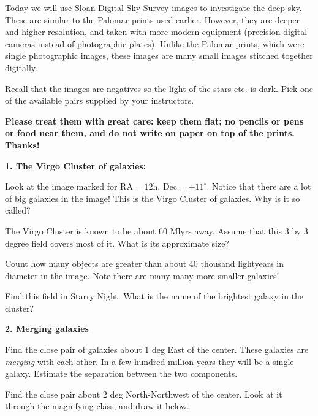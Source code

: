 
\noindent Today we will use Sloan Digital Sky Survey images
to investigate the deep sky. These are similar to the Palomar prints
used earlier. However, they are deeper and higher resolution, and
taken with more modern equipment (precision digital cameras instead of
photographic plates). Unlike the Palomar prints, which were single
photographic images, these images are many small images stitched
together digitally. 

Recall that the images are negatives so the light of the stars etc. is
dark. Pick one of the available pairs supplied by your instructors.

{\bf Please treat them with great care: keep them flat; no pencils or
pens or food near them, and do not write on paper on top of the
prints. Thanks!}

\noindent
{\bf 1. The Virgo Cluster of galaxies:} 

\noindent Look at the image marked for RA$=12$h,
Dec$=+11^\circ$. Notice that there are a lot of big galaxies in the
image! This is the Virgo Cluster of galaxies.  Why is it so called?

\vspace{20pt}

\noindent The Virgo Cluster is known to be about 60 Mlyrs away.
Assume that this 3 by 3 degree field covers most of it.  What is its
approximate size?

\vspace{40pt}

\noindent Count how many objects are greater than about 40 thousand
lightyears in diameter in the image. Note there are many many more
smaller galaxies!

\vspace{40pt}

\noindent Find this field in Starry Night.  What is the name of the
brightest galaxy in the cluster?

\vspace{20pt}

\noindent
{\bf 2. Merging galaxies}

\noindent Find the close pair of galaxies about 1 deg East of the
center. These galaxies are {\it merging} with each other.  In a few
hundred million years they will be a single galaxy.  Estimate the
separation between the two components.

\vspace{40pt}

\noindent Find the close pair about 2 deg North-Northwest of the
center. Look at it through the magnifying class, and draw it below.

